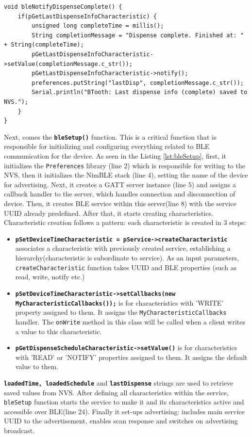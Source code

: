 \begin{lstlisting}[style=cppstyle, caption={bleNotifyDispenseComplete function responsible for information logging}, label={lst:dispcomplete}]
void bleNotifyDispenseComplete() {
	if(pGetLastDispenseInfoCharacteristic) {
		unsigned long completeTime = millis();
		String completionMessage = "Dispense complete. Finished at: " + String(completeTime);
		pGetLastDispenseInfoCharacteristic->setValue(completionMessage.c_str());
		pGetLastDispenseInfoCharacteristic->notify();
		preferences.putString("lastDisp", completionMessage.c_str());
		Serial.println("BTooth: Last dispense info (complete) saved to NVS.");
	}
}
\end{lstlisting}

Next, comes the \texttt{\textbf{bleSetup()}} function. This is a critical function that is responsible for initializing and configuring everything related to \ac{BLE} communication for the device. As seen in the Listing \ref{lst:bleSetup}, first, it initializes the \texttt{Preferences} library (line 2) which is responsible for writing to the \ac{NVS}, then it initializes the NimBLE stack (line 4), setting the name of the device for advertising. Next, it creates a \ac{GATT} server instance (line 5) and assigns a callback handler to the server, which handles connection and disconnection of device. Then, it creates \ac{BLE} service within this server(line 8) with the service \ac{UUID} already predefined. After that, it starts creating characteristics. Characteristic creation follows a pattern: each characteristic is created in 3 steps:
\begin{itemize}
	\item \textbf{\texttt{pSetDeviceTimeCharacteristic = pService->createCharacteristic}} associates a characteristic with previously created service, establishing a hierarchy(characteristic is subordinate to service). As an input parameters, \texttt{createCharacteristic} function takes \ac{UUID} and \ac{BLE} properties (such as read, write, notify etc.)
	\item \textbf{\texttt{pSetDeviceTimeCharacteristic->setCallbacks(new MyCharacteristicCallbacks());}} is for characteristics with 'WRITE' property assigned to them. It assigns the \texttt{MyCharacteristicCallbacks} handler. The \texttt{onWrite} method in this class will be called when a client writes a value to this characteristic.
	\item \texttt{\textbf{pGetDispenseScheduleCharacteristic->setValue()}} is for  characteristics with 'READ' or 'NOTIFY' properties assigned to them. It assigns the default value to them.
\end{itemize}
\texttt{\textbf{loadedTime, loadedSchedule}} and \textbf{\texttt{lastDispense}} strings are used to retrieve saved values from \ac{NVS}.
After defining all characteristics within the service, \texttt{bleSetup} function starts the service to make it and its characteristics active and accessible over \ac{BLE}(line 24). Finally it set-ups advertising: includes main service \ac{UUID} to the advertisement, enables scan response and switches on advertising broadcast.


